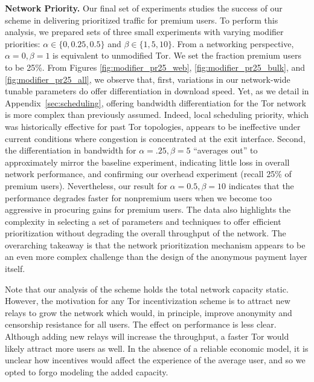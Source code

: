 \medskip \noindent \textbf{Network Priority.}
\label{sec:priority_exp} Our final set of experiments studies the success of our scheme in delivering prioritized traffic for premium users.
To perform this analysis, we prepared sets of three small experiments with varying modifier priorities: $\alpha \in \{0, 0.25, 0.5\}$ and $\beta \in \{1, 5, 10\}$.
From a networking perspective, $\alpha = 0, \beta = 1$ is equivalent to unmodified Tor.
We set the fraction premium users to be 25\%.
From Figures \ref{fig:modifier_pr25_web}, \ref{fig:modifier_pr25_bulk}, and \ref{fig:modifier_pr25_all}, we observe that, first, variations in our network-wide tunable parameters do offer differentiation in download speed.
Yet, as we detail in Appendix~\ref{sec:scheduling}, offering bandwidth differentiation for the Tor network is more complex than previously assumed.
Indeed, local scheduling priority, which was historically effective for past Tor topologies, appears to be ineffective under current conditions where congestion is concentrated at the exit interface.
Second, the differentiation in bandwidth for $\alpha = .25, \beta=5$ ``averages out'' to approximately mirror the baseline experiment, indicating little loss in overall network performance, and confirming our overhead experiment (recall 25\% of premium users).
Nevertheless, our result for $\alpha = 0.5, \beta=10$ indicates that the performance degrades faster for nonpremium users when we become too aggressive in procuring gains for premium users.
The data also highlights the complexity in selecting a set of parameters and techniques to offer efficient prioritization without degrading the overall throughput of the network.
The overarching takeaway is that the network prioritization mechanism appears to be an even more complex challenge than the design of the anonymous payment layer itself.

Note that our analysis of the scheme holds the total network capacity static.
However, the motivation for any Tor incentivization scheme is to attract new relays to grow the network which would, in principle, improve anonymity and censorship resistance for all users.
The effect on performance is less clear.
Although adding new relays will increase the throughput, a faster Tor would likely attract more users as well.
In the absence of a reliable economic model, it is unclear how incentives would affect the experience of the average user, and so we opted to forgo modeling the added capacity.

